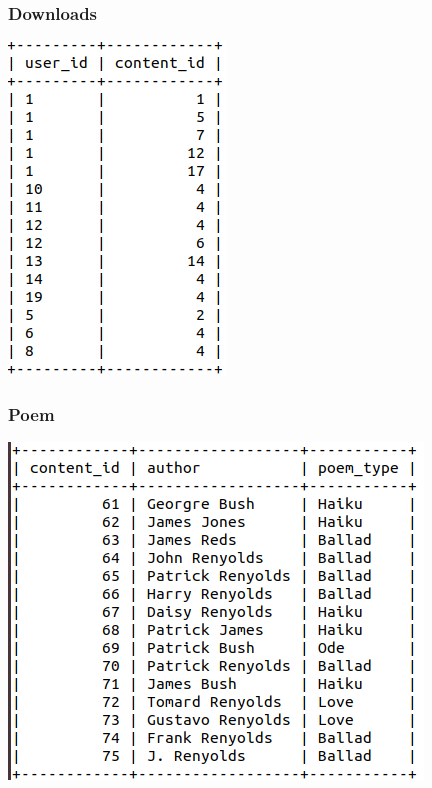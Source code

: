 \documentclass[letter, 12pt, titlepage]{article}
\begin{document}
		\subsubsection{Downloads}
			\includegraphics[scale=.5]{downloads.png}
		\subsubsection{Poem}
			\includegraphics[scale=.45]{poem.png}
\end{document}
